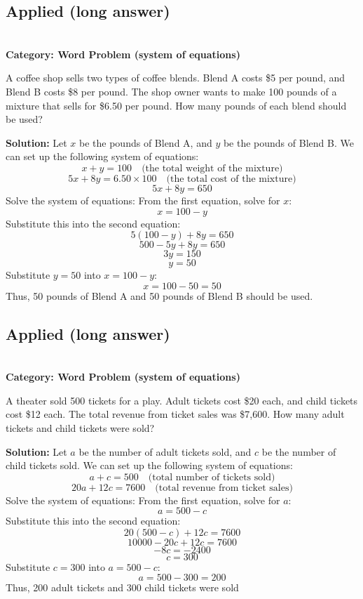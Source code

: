 \documentclass[12pt]{article}
\begin{document}
\subsection{Applied (long answer)}
\\
\textbf{Category: Word Problem (system of equations)} 

A coffee shop sells two types of coffee blends. Blend A costs \$5 per pound, and Blend B costs \$8 per pound. The shop owner wants to make 100 pounds of a mixture that sells for \$6.50 per pound. How many pounds of each blend should be used?

\textbf{Solution:}
Let \( x \) be the pounds of Blend A, and \( y \) be the pounds of Blend B. We can set up the following system of equations:
\[
x + y = 100 \quad \text{(the total weight of the mixture)}
\]
\[
5x + 8y = 6.50 \times 100 \quad \text{(the total cost of the mixture)}
\]
\[
5x + 8y = 650
\]
Solve the system of equations:
From the first equation, solve for \( x \):
\[
x = 100 - y
\]
Substitute this into the second equation:
\[
5(100 - y) + 8y = 650
\]
\[
500 - 5y + 8y = 650
\]
\[
3y = 150
\]
\[
y = 50
\]
Substitute \( y = 50 \) into \( x = 100 - y \):
\[
x = 100 - 50 = 50
\]
Thus, 50 pounds of Blend A and 50 pounds of Blend B should be used.

\vspace{1cm}

\subsection{Applied (long answer)}
\\
\textbf{Category: Word Problem (system of equations)} 

A theater sold 500 tickets for a play. Adult tickets cost \$20 each, and child tickets cost \$12 each. The total revenue from ticket sales was \$7,600. How many adult tickets and child tickets were sold?

\textbf{Solution:}
Let \( a \) be the number of adult tickets sold, and \( c \) be the number of child tickets sold. We can set up the following system of equations:
\[
a + c = 500 \quad \text{(total number of tickets sold)}
\]
\[
20a + 12c = 7600 \quad \text{(total revenue from ticket sales)}
\]
Solve the system of equations:
From the first equation, solve for \( a \):
\[
a = 500 - c
\]
Substitute this into the second equation:
\[
20(500 - c) + 12c = 7600
\]
\[
10000 - 20c + 12c = 7600
\]
\[
-8c = -2400
\]
\[
c = 300
\]
Substitute \( c = 300 \) into \( a = 500 - c \):
\[
a = 500 - 300 = 200
\]
Thus, 200 adult tickets and 300 child tickets were sold
\end{document}
